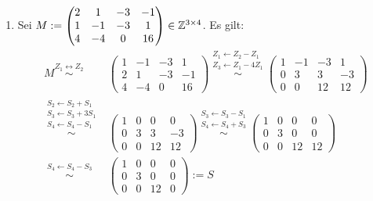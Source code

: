 \documentclass[../../main.tex]{subfiles}
\begin{document}
\begin{bsp}\label{17.1.4}
    \begin{enumerate}[\normalfont(a)]
        \item Sei $M:=\begin{pmatrix*}2 & 1 & -3 & -1\\ 1 & -1 & -3 & 1\\ 4 & -4 & 0 & 16\end{pmatrix*}\in \Z^{3\times 4}$. Es gilt:
        \begin{align*}
            M\stackrel{Z_1\leftrightarrow Z_2}{\sim}&\begin{pmatrix*}1 & -1 & -3 & 1\\ 2 & 1 & -3 & -1\\ 4 & -4 & 0 & 16\end{pmatrix*}\stackrel{\begin{smallmatrix*}Z_1\leftarrow Z_2-Z_1\\Z_3\leftarrow Z_1-4Z_1\end{smallmatrix*}}{\sim}\begin{pmatrix*}1 & -1 & -3 & 1\\ 0 &3 & 3 & -3\\ 0 & 0 & 12 & 12\end{pmatrix*}\\
            \stackrel{\begin{smallmatrix*}S_2\leftarrow S_2+S_1\\S_3\leftarrow S_3+3S_1\\ S_4\leftarrow S_4-S_1\end{smallmatrix*}}{\sim}&\begin{pmatrix*}1 & 0 & 0 & 0\\ 0 &3 & 3 & -3\\ 0 & 0 & 12 & 12\end{pmatrix*}\stackrel{\begin{smallmatrix*}S_3\leftarrow S_3-S_1\\ S_4\leftarrow S_4+S_3\end{smallmatrix*}}{\sim}\begin{pmatrix*}1 & 0 & 0 & 0\\ 0 &3 & 0 & 0\\ 0 & 0 & 12 & 12\end{pmatrix*}\\
            \stackrel{\begin{smallmatrix*}S_4\leftarrow S_4-S_3\end{smallmatrix*}}{\sim}&\begin{pmatrix*}1 & 0 & 0 & 0\\ 0 &3 & 0 & 0\\ 0 & 0 & 12 & 0\end{pmatrix*}:=S

\end{align*}
\end{enumerate}
\end{bsp}
\end{document}
